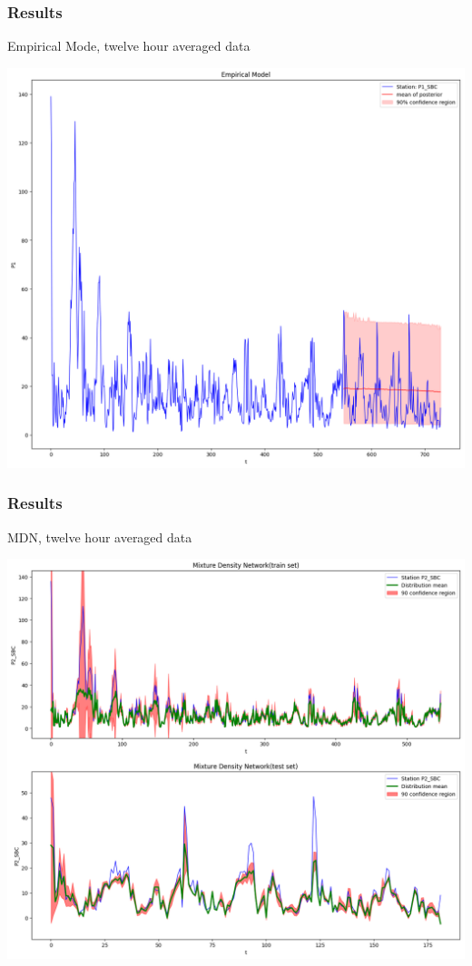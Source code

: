 \documentclass[18pt]{beamer}
\begin{document}
\begin{frame}[t]
  \frametitle{Results}
  Empirical Mode, twelve hour averaged data
  \begin{center}
    \includegraphics[scale=0.25]{images/12h/emp-12h}
  \end{center}  
\end{frame}

\begin{frame}[t]
  \frametitle{Results}
  MDN, twelve hour averaged data
  \begin{center}
    \includegraphics[scale=0.25]{images/12h/mdn_12h}
  \end{center}  
\end{frame}
\end{document}
